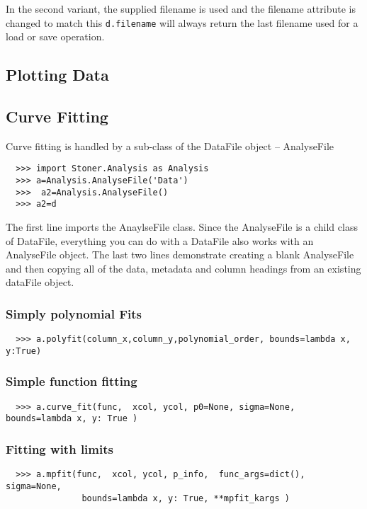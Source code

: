\documentclass[a4paper,11pt]{scrartcl}
\begin{document}
In the second variant, the supplied filename is used and the filename attribute is changed to match this \ie \verb#d.filename# will always return the last filename used for a load or save operation.

\subsection{Plotting Data}

\subsection{Curve Fitting}

Curve fitting is handled by a sub-class of the DataFile object -- AnalyseFile

\begin{verbatim}
  >>> import Stoner.Analysis as Analysis
  >>> a=Analysis.AnalyseFile('Data')
  >>>  a2=Analysis.AnalyseFile()
  >>> a2=d
\end{verbatim}

The first line imports the AnaylseFile class. Since the AnalyseFile is a child class of DataFile, everything you can do with a DataFile also works with an AnalyseFile object. The last two lines demonstrate creating a blank AnalyseFile and then copying all of the data, metadata and column headings from an existing dataFile object.

\subsubsection{Simply polynomial Fits}
\begin{verbatim}
  >>> a.polyfit(column_x,column_y,polynomial_order, bounds=lambda x, y:True)
\end{verbatim}

\subsubsection{Simple function fitting}
\begin{verbatim}
  >>> a.curve_fit(func,  xcol, ycol, p0=None, sigma=None, bounds=lambda x, y: True )
\end{verbatim}

\subsubsection{Fitting with limits}
\begin{verbatim}
  >>> a.mpfit(func,  xcol, ycol, p_info,  func_args=dict(), sigma=None, 
               bounds=lambda x, y: True, **mpfit_kargs )
\end{verbatim}
\end{document}
